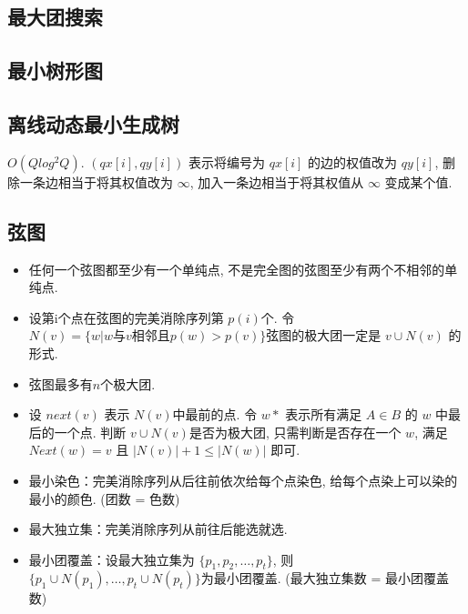 \documentclass[landscape, twocolumn, 8pt, a4paper, twoside]{extarticle}
\begin{document}
%    

  \subsection{最大团搜索}
    
  
%    

  \subsection{最小树形图}
    

  \subsection{离线动态最小生成树}
    $O (Q log^2 Q) $.
    $(qx[i], qy[i])$ 表示将编号为 $qx[i]$ 的边的权值改为 $qy[i]$,
    删除一条边相当于将其权值改为 $\infty$,
    加入一条边相当于将其权值从 $\infty$ 变成某个值.
    

  \subsection{弦图}
    \begin{itemize}
    \item 任何一个弦图都至少有一个单纯点, 不是完全图的弦图至少有两个不相邻的单纯点. 
    \item 设第i个点在弦图的完美消除序列第 $p(i)$个. 令 $N(v) = \{w | w \text{与} v \text{相邻且} p(w) > p(v) \}$弦图的极大团一定是 $v \cup N(v)$ 的形式. 
    \item 弦图最多有$n$个极大团. 
    \item 设 $next(v)$ 表示 $N(v)$中最前的点. 令 $w*$ 表示所有满足 $A\in B$ 的 $w$ 中最后的一个点. 
          判断 $v \cup N(v)$是否为极大团,
          只需判断是否存在一个 $w$, 
          满足 $Next(w) = v$ 且 $|N(v)| + 1 \le |N(w)|$ 即可. 
    \item 最小染色：完美消除序列从后往前依次给每个点染色, 给每个点染上可以染的最小的颜色. (团数 = 色数)
    \item 最大独立集：完美消除序列从前往后能选就选. 
    \item 最小团覆盖：设最大独立集为 $\{p_1, p_2, \ldots, p_t\}$, 则 $\{p_1 \cup N(p_1), \ldots, p_t \cup N(p_t) \}$为最小团覆盖.  (最大独立集数 = 最小团覆盖数)
    \end{itemize}
\end{document}
